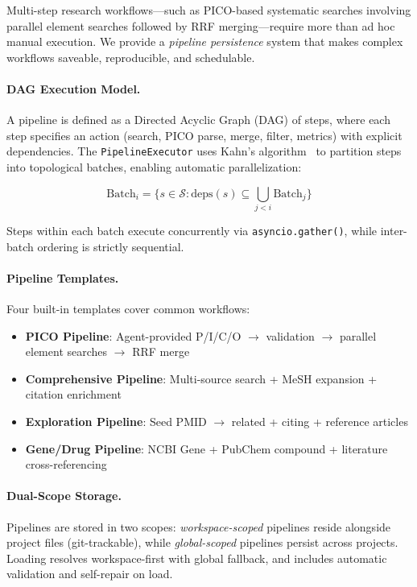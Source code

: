 \documentclass[11pt,a4paper]{article}
\begin{document}
Multi-step research workflows---such as PICO-based systematic searches involving parallel element searches followed by RRF merging---require more than ad hoc manual execution.
We provide a \emph{pipeline persistence} system that makes complex workflows saveable, reproducible, and schedulable.

\paragraph{DAG Execution Model.}
A pipeline is defined as a Directed Acyclic Graph (DAG) of steps, where each step specifies an action (search, PICO parse, merge, filter, metrics) with explicit dependencies.
The \texttt{PipelineExecutor} uses Kahn's algorithm~\citep{kahn1962topological} to partition steps into topological batches, enabling automatic parallelization:

\begin{equation}
\text{Batch}_i = \{s \in \mathcal{S} : \text{deps}(s) \subseteq \bigcup_{j<i} \text{Batch}_j \}
\label{eq:batches}
\end{equation}

Steps within each batch execute concurrently via \texttt{asyncio.gather()}, while inter-batch ordering is strictly sequential.

\paragraph{Pipeline Templates.}
Four built-in templates cover common workflows:
\begin{itemize}
    \item \textbf{PICO Pipeline}: Agent-provided P/I/C/O $\rightarrow$ validation $\rightarrow$ parallel element searches $\rightarrow$ RRF merge
    \item \textbf{Comprehensive Pipeline}: Multi-source search + MeSH expansion + citation enrichment
    \item \textbf{Exploration Pipeline}: Seed PMID $\rightarrow$ related + citing + reference articles
    \item \textbf{Gene/Drug Pipeline}: NCBI Gene + PubChem compound + literature cross-referencing
\end{itemize}

\paragraph{Dual-Scope Storage.}
Pipelines are stored in two scopes:
\emph{workspace-scoped} pipelines reside alongside project files (git-trackable), while \emph{global-scoped} pipelines persist across projects.
Loading resolves workspace-first with global fallback, and includes automatic validation and self-repair on load.
\end{document}
